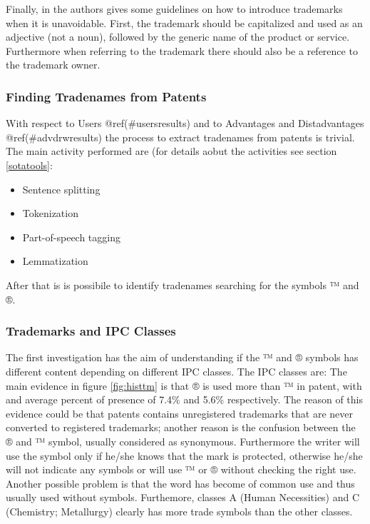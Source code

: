 \documentclass[]{book}
\providecommand{\tightlist}{%
  \setlength{\itemsep}{0pt}\setlength{\parskip}{0pt}}
\begin{document}
Finally, in \citep{pressman2018nolo} the authors gives some guidelines
on how to introduce trademarks when it is unavoidable. First, the
trademark should be capitalized and used as an adjective (not a noun),
followed by the generic name of the product or service. Furthermore when
referring to the trademark there should also be a reference to the
trademark owner.

\subsubsection{Finding Tradenames from
Patents}\label{finding-tradenames-from-patents}

With respect to Users @ref(\#usersresults) and to Advantages and
Distadvantages @ref(\#advdrwresults) the process to extract tradenames
from patents is trivial. The main activity performed are (for details
aobut the activities see section \ref{sotatools}:

\begin{itemize}
\tightlist
\item
  Sentence splitting
\item
  Tokenization
\item
  Part-of-speech tagging
\item
  Lemmatization
\end{itemize}

After that is is possibile to identify tradenames searching for the
symbols ™ and ®.

\subsubsection{Trademarks and IPC
Classes}\label{trademarks-and-ipc-classes}

The first investigation has the aim of understanding if the ™ and ®
symbols has different content depending on different IPC \citep{wipo1}
classes. The IPC classes are: The main evidence in figure
\ref{fig:histtm} is that ® is used more than ™ in patent, with and
average percent of presence of 7.4\% and 5.6\% respectively. The reason
of this evidence could be that patents contains unregistered trademarks
that are never converted to registered trademarks; another reason is the
confusion between the ® and ™ symbol, usually considered as synonymous.
Furthermore the writer will use the symbol only if he/she knows that the
mark is protected, otherwise he/she will not indicate any symbols or
will use ™ or ® without checking the right use. Another possible problem
is that the word has become of common use and thus usually used without
symbols. Furthemore, classes A (Human Necessities) and C (Chemistry;
Metallurgy) clearly has more trade symbols than the other classes.
\end{document}
